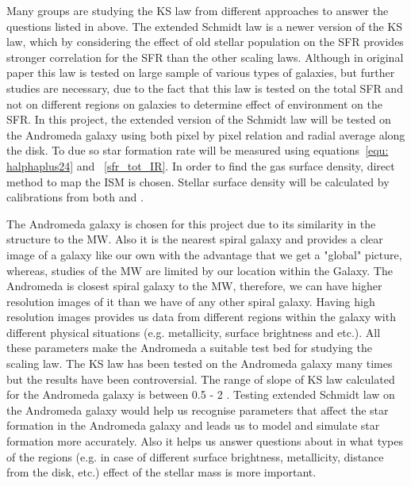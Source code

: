 Many groups are studying the KS law from different approaches to answer the questions listed in above. The extended Schmidt law is a newer version of the KS law, which by considering the effect of old stellar population on the SFR provides stronger correlation for the SFR than the other scaling laws. Although in original paper this law is tested on large sample of various types of galaxies, but further studies are necessary, due to the fact that this law is tested on the total SFR and not on different regions on galaxies to determine effect of environment on the SFR. In this project, the extended version of the Schmidt law will be tested on the Andromeda galaxy using both pixel by pixel relation and radial average along the disk. To due so star formation rate will be measured using equations~\ref{equ: halphaplus24} and ~\ref{sfr_tot_IR}. In order to find the gas surface density, direct method to map the ISM is chosen. Stellar surface density will be calculated by calibrations from both \cite{Eskew12} and \cite{Zhu10}.

The Andromeda galaxy is chosen for this project due to its similarity in the structure to the MW. Also it is the nearest spiral galaxy and provides a clear image of a galaxy like our own with the advantage that we get a "global" picture, whereas, studies of the MW are limited by our location within the Galaxy.  The Andromeda is closest spiral galaxy to the MW, therefore, we can have higher resolution images of it than we have of any other spiral galaxy. Having high resolution images provides us data from different regions within the galaxy with different physical situations (e.g. metallicity, surface brightness and etc.). All these parameters make the Andromeda a suitable test bed for studying the scaling law. The KS law has been tested on the Andromeda galaxy many times but the results have been controversial. The range of slope of KS law calculated for the Andromeda galaxy is between 0.5 - 2 \citep[e.g.,][]{Tabatabaei10, Ford13}. Testing extended Schmidt law on the Andromeda galaxy would help us recognise parameters that affect the star formation in the Andromeda galaxy and leads us to model and simulate star formation more accurately. Also it helps us answer questions about in what types of the regions (e.g. in case of different surface brightness, metallicity, distance from the disk, etc.) effect of the stellar mass is more important.


